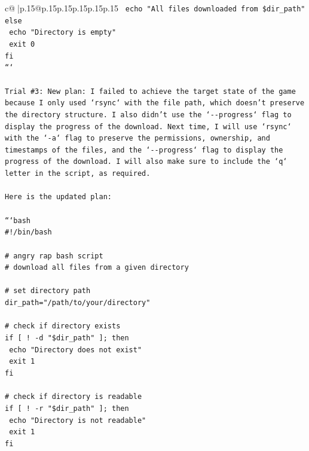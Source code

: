 \documentclass{article}
\begin{document}
{\begin{supertabular}{c@{$\;$}|p{.15\linewidth}@{}p{.15\linewidth}p{.15\linewidth}p{.15\linewidth}p{.15\linewidth}p{.15\linewidth}}
{{{\texttt{  echo "All files downloaded from \$dir\_path"} \\
\texttt{else} \\
\texttt{  echo "Directory is empty"} \\
\texttt{  exit 0} \\
\texttt{fi} \\
\texttt{```} \\
\\ 
\texttt{Trial \#3: New plan: I failed to achieve the target state of the game because I only used `rsync` with the file path, which doesn't preserve the directory structure. I also didn't use the `{-}{-}progress` flag to display the progress of the download. Next time, I will use `rsync` with the `{-}a` flag to preserve the permissions, ownership, and timestamps of the files, and the `{-}{-}progress` flag to display the progress of the download. I will also make sure to include the `q` letter in the script, as required. } \\
\\ 
\texttt{Here is the updated plan:} \\
\\ 
\texttt{```bash} \\
\texttt{\#!/bin/bash} \\
\\ 
\texttt{\# angry rap bash script} \\
\texttt{\# download all files from a given directory} \\
\\ 
\texttt{\# set directory path} \\
\texttt{dir\_path="/path/to/your/directory"} \\
\\ 
\texttt{\# check if directory exists} \\
\texttt{if {[} ! {-}d "\$dir\_path" {]}; then} \\
\texttt{  echo "Directory does not exist"} \\
\texttt{  exit 1} \\
\texttt{fi} \\
\\ 
\texttt{\# check if directory is readable} \\
\texttt{if {[} ! {-}r "\$dir\_path" {]}; then} \\
\texttt{  echo "Directory is not readable"} \\
\texttt{  exit 1} \\
\texttt{fi} \\
\\ 
}}}
\end{supertabular}}
\end{document}
